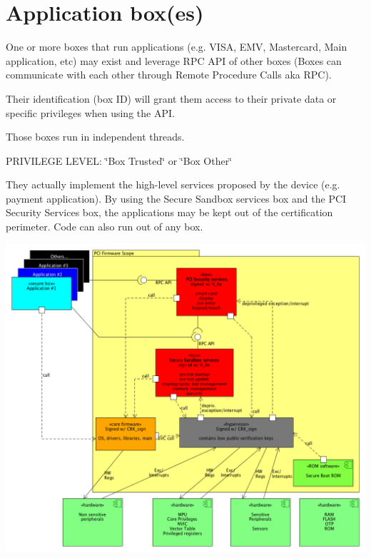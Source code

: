 \hypertarget{group__appbx}{}\section{Application box(es)}
\label{group__appbx}
One or more boxes that run applications (e.\+g. V\+I\+SA, E\+MV, Mastercard, Main application, etc) may exist and leverage R\+PC A\+PI of other boxes (Boxes can communicate with each other through Remote Procedure Calls aka R\+PC).

Their identification (box ID) will grant them access to their private data or specific privileges when using the A\+PI.

Those boxes run in independent threads.

P\+R\+I\+V\+I\+L\+E\+GE L\+E\+V\+EL\+: \char`\"{}\+Box Trusted\char`\"{} or \char`\"{}\+Box Other\char`\"{}

They actually implement the high-\/level services proposed by the device (e.\+g. payment application). By using the Secure Sandbox services box and the P\+CI Security Services box, the applications may be kept out of the certification perimeter. Code can also run out of any box.


\begin{DoxyImageNoCaption}
  \mbox{\includegraphics[width=\textwidth,height=\textheight/2,keepaspectratio=true]{pci_cortex.png}}
\end{DoxyImageNoCaption}
  